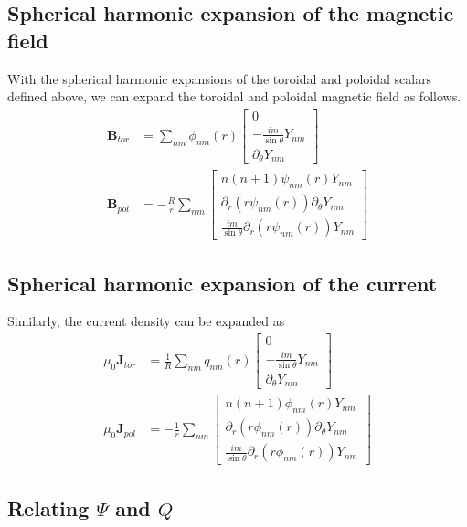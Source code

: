 \documentclass{article}
\newcommand{\B}{\mathbf{B}}
\newcommand{\J}{\mathbf{J}}
\begin{document}
\subsection{Spherical harmonic expansion of the magnetic field}

With the spherical harmonic expansions of the toroidal and poloidal
scalars defined above, we can expand the toroidal and poloidal magnetic
field as follows.
\begin{align}
\B_{tor} &= \sum_{nm} \phi_{nm}(r)
\left[
\begin{array}{c}
0 \\
-\frac{im}{\sin{\theta}} Y_{nm} \\
\partial_{\theta} Y_{nm}
\end{array}
\right] \label{eqn:Btor} \\
\B_{pol} &= -\frac{R}{r} \sum_{nm}
\left[
\begin{array}{c}
n(n+1) \psi_{nm}(r) Y_{nm} \\
\partial_r \left( r \psi_{nm}(r) \right) \partial_{\theta} Y_{nm} \\
\frac{im}{\sin{\theta}} \partial_r \left( r \psi_{nm}(r) \right) Y_{nm}
\end{array}
\right] \label{eqn:Bpol}
\end{align}

\subsection{Spherical harmonic expansion of the current}

Similarly, the current density can be expanded as
\begin{align}
\mu_0 \J_{tor} &= \frac{1}{R} \sum_{nm} q_{nm}(r)
\left[
\begin{array}{c}
0 \\
-\frac{im}{\sin{\theta}} Y_{nm} \\
\partial_{\theta} Y_{nm}
\end{array}
\right] \\
\mu_0 \J_{pol} &= -\frac{1}{r} \sum_{nm}
\left[
\begin{array}{c}
n(n+1) \phi_{nm}(r) Y_{nm} \\
\partial_r \left( r \phi_{nm}(r) \right) \partial_{\theta} Y_{nm} \\
\frac{im}{\sin{\theta}} \partial_r \left( r \phi_{nm}(r) \right) Y_{nm}
\end{array}
\right]
\end{align}

\subsection{Relating $\Psi$ and $Q$}
\end{document}

